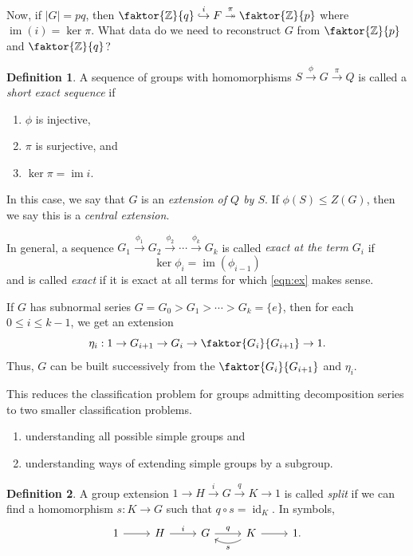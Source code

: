 \documentclass[10pt,letterpaper,cm]{nupset}
\theoremstyle{definition}
\newtheorem{definition}{Definition}[subsection]
\theoremstyle{theorem}
\theoremstyle{remark}
\newcommand{\Z}{\mathbb Z}
\newcommand{\1}{\mathbf{1}}
\newcommand{\0}{\vec 0}
\DeclareMathOperator{\id}{\mathrm{id}}
\DeclareMathOperator{\im}{im}
\begin{document}
\bigskip


Now, if $\lvert{G}\rvert = pq$, then $\faktor{\Z}{q} \overset{i}{\hookrightarrow} F \overset{\pi}{\twoheadrightarrow} \faktor{\Z}{p}$ where $\im(i) = \ker{\pi}$. What data do we need to reconstruct $G$ from $\faktor{\Z}{p}$ and $\faktor{\Z}{q}$?



\begin{definition}
A sequence of groups with homomorphisms $S \overset{\phi}{\longrightarrow} G \overset{\pi}{\longrightarrow} Q$ is called a \textit{short exact sequence}  if
\begin{enumerate}[label=(\roman*)]
\item  $\phi$ is injective, 
\item $\pi$ is surjective, and 
\item $\ker{\pi} = \im{i}$. 
\end{enumerate}
In this case, we say that $G$ is an \textit{extension of $Q$ by $S$}. If $\phi(S) \leq Z(G)$, then we say this is a \textit{central extension}.
\end{definition}


In general, a sequence $G_1 \overset{\phi_1}{\longrightarrow} G_2 \overset{\phi_2}{\longrightarrow} \cdots \overset{\phi_k}{\longrightarrow} G_k$ is called \textit{exact at the term $G_i$} if 
\[\label{eqn:ex}
\ker{\phi_i} = \im(\phi_{i-1}) \tag{$\ast$}
\] and is called \textit{exact} if it is exact at all terms for which \eqref{eqn:ex} makes sense.

\medskip

If $G$ has subnormal series $G = G_0 > G_1 > \cdots > G_k = \{e\}$, then for each $0 \leq i \leq k-1$, we get an extension $$\eta_i : 1 \to G_{i+1} \to G_i \to \faktor{G_i}{G_{i+1}} \to 1.$$ Thus, $G$ can be built successively from the $\faktor{G_i}{G_{i+1}}$ and $\eta_i$.

\smallskip

This reduces the classification problem for groups admitting decomposition series to two smaller classification problems.
\begin{enumerate}[label=(\Roman*)]
\item understanding all possible simple groups and
\item understanding ways of extending simple groups by a subgroup.
\end{enumerate}

\begin{definition}
A group extension $1 \to H  \overset{i}{\longrightarrow} G \overset{q}{\longrightarrow} K \to 1$ is called \textit{split} if we can find a homomorphism $s : K \to G$ such that $q \circ s = \id_K$. In symbols, \[
	\begin{tikzcd}
	1\rar & H\rar["i" above] & G\rar["q" above] & K\rar\lar[bend left=30,"s" below] & 1. \\
	\end{tikzcd}
\]
\end{definition}
\end{document}
